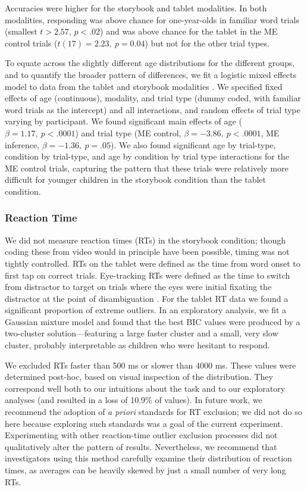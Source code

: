 \documentclass[man,noapacite]{apa2}
\begin{document}
Accuracies were higher for the storybook and tablet modalities. In both modalities, responding was above chance for one-year-olds in familiar word trials (smallest $t > 2.57$, $p < .02$) and was above chance for the tablet in the ME control trials ($t(17) = 2.23,~p = 0.04$) but not for the other trial types. 

To equate across the slightly different age distributions for the different groups, and to quantify the broader pattern of differences, we fit a logistic mixed effects model to data from the tablet and storybook modalities \cite{jaeger2008}. We specified fixed effects of age (continuous), modality, and trial type (dummy coded, with familiar word trials as the intercept) and all interactions, and random effects of trial type varying by participant. We found significant main effects of age ($\beta = 1.17,~p < .0001$) and trial type (ME control, $\beta = -3.86,~p <.0001$, ME inference, $\beta = -1.36,~p = .05$). We also found significant age by trial-type, condition by trial-type, and age by condition by trial type interactions for the ME control trials, capturing the pattern that these trials were relatively more difficult for younger children in the storybook condition than the tablet condition.

\subsubsection{Reaction Time}

We did not measure reaction times (RTs) in the storybook condition; though coding these from video would in principle have been possible, timing was not tightly controlled. RTs on the tablet were defined as the time from word onset to first tap on correct trials. Eye-tracking RTs were defined as the time to switch from distractor to target on trials where the eyes were initial fixating the distractor at the point of disambiguation \cite<for more details, see>{fernald2008}. For the tablet RT data we found a significant proportion of extreme outliers. In an exploratory analysis, we fit a Gaussian mixture model and found that the best BIC values were produced by a two-cluster solution---featuring a large faster cluster and a small, very slow cluster, probably interpretable as children who were hesitant to respond.

We excluded RTs faster than 500 ms or slower than 4000 ms. These values were determined post-hoc, based on visual inspection of the distribution. They correspond well both to our intuitions about the task and to our exploratory analyses (and resulted in a loss of 10.9\% of values). In future work, we recommend the adoption of {\it a priori} standards for RT exclusion; we did not do so here because exploring such standards was a goal of the current experiment. Experimenting with other reaction-time outlier exclusion processes did not qualitatively alter the pattern of results. Nevertheless, we recommend that investigators using this method carefully examine their distribution of reaction times, as averages can be heavily skewed by just a small number of very long RTs.
\end{document}
